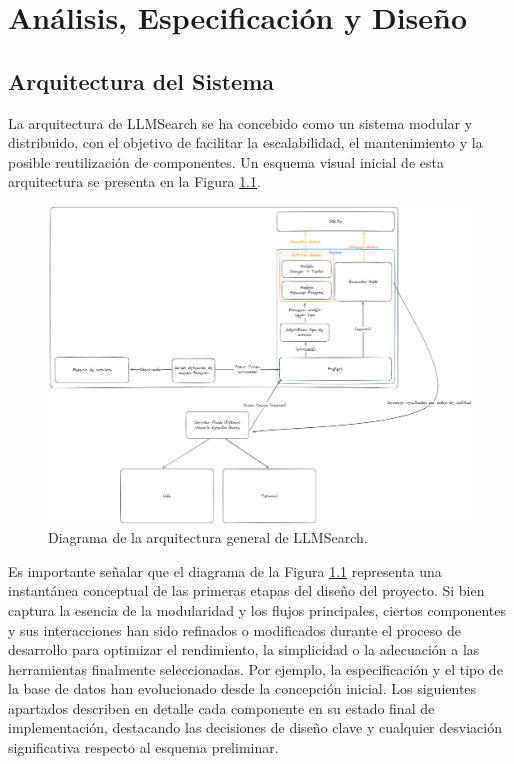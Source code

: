 
\chapter{Análisis, Especificación y Diseño}
\label{analisis}

\section{Arquitectura del Sistema}
\label{sec:arquitectura_sistema}

La arquitectura de LLMSearch se ha concebido como un sistema modular y distribuido, con el objetivo de facilitar la escalabilidad, el mantenimiento y la posible reutilización de componentes. Un esquema visual inicial de esta arquitectura se presenta en la Figura \ref{fig:arquitectura_general}.

\begin{figure}[H]
  \centering
  \includegraphics[width=\textwidth]{archivos/arquitectura.png}
  \caption[Arquitectura de LLMSearch]{Diagrama de la arquitectura general de LLMSearch.}
  \label{fig:arquitectura_general}
\end{figure}

Es importante señalar que el diagrama de la Figura \ref{fig:arquitectura_general} representa una instantánea conceptual de las primeras etapas del diseño del proyecto. Si bien captura la esencia de la modularidad y los flujos principales, ciertos componentes y sus interacciones han sido refinados o modificados durante el proceso de desarrollo para optimizar el rendimiento, la simplicidad o la adecuación a las herramientas finalmente seleccionadas. Por ejemplo, la especificación y el tipo de la base de datos han evolucionado desde la concepción inicial. Los siguientes apartados describen en detalle cada componente en su estado final de implementación, destacando las decisiones de diseño clave y cualquier desviación significativa respecto al esquema preliminar.

